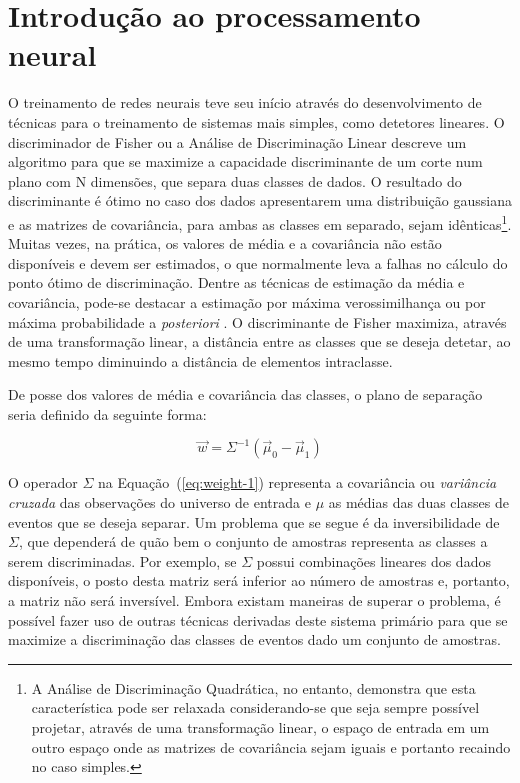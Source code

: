 \typeout{ ====================================================================}
\typeout{ ====================================================================}

\chapter{Introdução ao processamento neural}
\label{ap:rna}

O treinamento de redes neurais teve seu início através do desenvolvimento de
técnicas para o treinamento de sistemas mais simples, como detetores lineares.
O discriminador de Fisher \cite{fisher} ou a Análise de Discriminação Linear
descreve um algoritmo para que se maximize a capacidade discriminante de um
corte num plano com N dimensões, que separa duas classes de dados. O resultado
do discriminante é ótimo no caso dos dados apresentarem uma distribuição
gaussiana e as matrizes de covariância, para ambas as classes em separado,
sejam idênticas\footnote{A Análise de Discriminação Quadrática, no entanto,
demonstra que esta característica pode ser relaxada considerando-se que seja
sempre possível projetar, através de uma transformação linear, o espaço de
entrada em um outro espaço onde as matrizes de covariância sejam iguais e
portanto recaindo no caso simples.}. Muitas vezes, na prática, os valores de
média e a covariância não estão disponíveis e devem ser estimados, o que
normalmente leva a falhas no cálculo do ponto ótimo de discriminação. Dentre
as técnicas de estimação da média e covariância, pode-se destacar a estimação
por máxima verossimilhança ou por máxima probabilidade a \textit{posteriori}
\cite{duda}. O discriminante de Fisher maximiza, através de uma transformação
linear, a distância entre as classes que se deseja detetar, ao mesmo tempo
diminuindo a distância de elementos intraclasse.

De posse dos valores de média e covariância das classes, o plano de separação
seria definido da seguinte forma:

\begin{equation}
\overrightarrow{w} = \Sigma^{-1}(\overrightarrow{\mu}_0 -
\overrightarrow{\mu}_1) 
\label{eq:weight-1}
\end{equation}

O operador $\Sigma$ na Equação~(\ref{eq:weight-1}) representa a covariância ou
\textit{variância cruzada} das observações do universo de entrada e $\mu$ as
médias das duas classes de eventos que se deseja separar. Um problema que se
segue é da inversibilidade de $\Sigma$, que dependerá de quão bem o conjunto
de amostras representa as classes a serem discriminadas. Por exemplo, se
$\Sigma$ possui combinações lineares dos dados disponíveis, o posto desta
matriz será inferior ao número de amostras e, portanto, a matriz não será
inversível. Embora existam maneiras de superar o problema, é possível fazer
uso de outras técnicas derivadas deste sistema primário para que se maximize a
discriminação das classes de eventos dado um conjunto de amostras.

